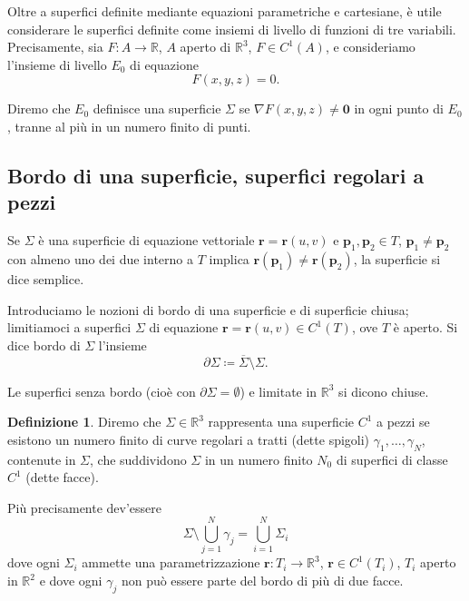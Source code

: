 \documentclass[a4paper]{book}
\numberwithin{equation}{section}
\theoremstyle{plain}
\theoremstyle{definition}
\newtheorem{defn}{Definizione}[section]
\theoremstyle{remark}
\renewcommand{\vec}{\boldsymbol}
\theoremstyle{example}
\begin{document}
	Oltre a superfici definite mediante equazioni parametriche e cartesiane, è utile considerare le superfici definite come insiemi di livello di funzioni di tre variabili. Precisamente, sia $F \colon A \to \mathbb{R}$, $A$ aperto di $\mathbb{R}^3$, $F \in C^1(A)$, e consideriamo l'insieme di livello $E_0$ di equazione
		\begin{equation}
F(x, y, z) = 0.
		\end{equation}

	Diremo che $E_0$ definisce una superficie $\Sigma$ se $\nabla F(x, y, z) \ne \vec{0}$ in ogni punto di $E_0$, tranne al più in un numero finito di punti.

	\subsection{Bordo di una superficie, superfici regolari a pezzi}
	Se $\Sigma$ è una superficie di equazione vettoriale $\vec{r} = \vec{r}(u, v)$ e $\vec{p}_1, \vec{p}_2 \in T$, $\vec{p}_1 \ne \vec{p}_2$ con almeno uno dei due interno a $T$ implica $\vec{r}(\vec{p}_1) \ne \vec{r}(\vec{p}_2)$, la superficie si dice semplice.

	Introduciamo le nozioni di bordo di una superficie e di superficie chiusa; limitiamoci a superfici $\Sigma$ di equazione $\vec{r} = \vec{r}(u, v) \in C^1(T)$, ove $T$ è aperto. Si dice bordo di $\Sigma$ l'insieme
		\begin{equation*}
			\partial \Sigma \coloneqq \overline{\Sigma}\setminus \Sigma.
		\end{equation*}

		Le superfici senza bordo (cioè con $\partial \Sigma = \emptyset$) e limitate in $\mathbb{R}^3$ si dicono chiuse.

		\begin{defn}
			Diremo che $\Sigma \in \mathbb{R}^3$ rappresenta una superficie $C^1$ a pezzi se esistono un numero finito di curve regolari a tratti (dette spigoli) $\gamma_1, \dots, \gamma_N$, contenute in $\Sigma$, che suddividono $\Sigma$ in un numero finito $N_0$ di superfici di classe $C^1$ (dette facce).
		\end{defn}

	Più precisamente dev'essere
		\begin{equation*}
			\Sigma \setminus \bigcup_{j=1}^N \gamma_j = \bigcup_{i = 1}^N \Sigma_i
		\end{equation*}
dove ogni $\Sigma_i$ ammette una parametrizzazione $\vec{r}\colon T_i \to \mathbb{R}^3$, $\vec{r} \in C^1(T_i)$, $T_i$ aperto in $\mathbb{R}^2$ e dove ogni $\gamma_j$ non può essere parte del bordo di più di due facce.
\end{document}
